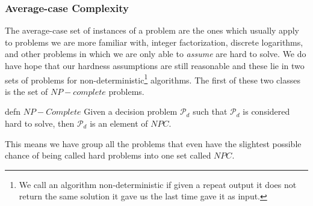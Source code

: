 \subsubsection*{Average-case Complexity}

The average-case set of instances of a problem are the ones which usually apply to problems we are more familiar with, integer factorization, discrete logarithms, and other problems in which we are only able to \emph{assume} are hard to solve. We do have hope that our hardness assumptions are still reasonable and these lie in two sets of problems for non-deterministic\footnote{We call an algorithm non-deterministic if given a repeat output it does not return the same solution it gave us the last time gave it as input.} algorithms. The first of these two classes is the set of $NP-complete$ problems.
\medskip

{defn}
{$NP-Complete$}
{Given a decision problem $\mathcal{P}_{d}$ such that $\mathcal{P}_{d}$ is considered hard to solve, then $\mathcal{P}_{d}$ is an element of $NPC$.}
\medskip

This means we have group all the problems that even have the slightest possible chance of being called hard problems into one set called $NPC$. 

\medskip

